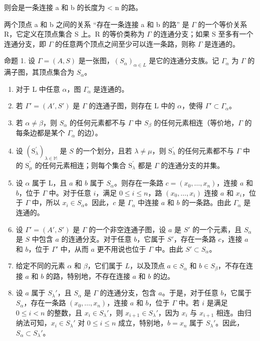 则会是一条连接 a 和 b 的长度为 \textless{} n 的路。

两个顶点 a 和 b 之间的关系 ``存在一条连接 a 和 b 的路'' 是 \(\Gamma\) 的一个等价关系 R，它定义在顶点集合 S 上。R 的等价类称为 \(\Gamma\) 的连通分支；如果 S 至多有一个连通分支，即 \(\Gamma\) 的任意两个顶点之间至少可以连一条路，则称 \(\Gamma\) 是连通的。

命题 1. 设 \(\Gamma = (A, S)\) 是一张图，\((S_{\alpha})_{\alpha \in L}\) 是它的连通分支族。记 \(\Gamma_{\alpha}\) 为 \(\Gamma\) 的满子图，其顶点集合为 \(S_{\alpha}\)。

\begin{enumerate}
\def\labelenumi{(\roman{enumi})}
\item
  对于 L 中任意 \(\alpha\)，图 \(\Gamma_{\alpha}\) 是连通的。
\item
  若 \(\Gamma' = (A', S')\) 是 \(\Gamma\) 的连通子图，则存在 L 中的 \(\alpha\)，使得 \(\Gamma' \subset \Gamma_{\alpha}\)。
\item
  若 \(\alpha \neq \beta\)，则 \(S_{\alpha}\) 的任何元素都不与 \(\Gamma\) 中 \(S_{\beta}\) 的任何元素相连（等价地，\(\Gamma\) 的每条边都是某个 \(\Gamma_{\alpha}\) 的边）。
\item
  设 \((\mathrm{S}_{\lambda}^{\prime})_{\lambda \in \mathbb{M}}\) 是 \(S\) 的一个划分，且若 \(\lambda \neq \mu\)，则 \(\mathrm{S}_{\lambda}^{\prime}\) 的任何元素都不与 \(\Gamma\) 中的 \(\mathrm{S}_{\mu}^{\prime}\) 的任何元素相连；则每个集合 \(\mathrm{S}_{\lambda}^{\prime}\) 都是 \(\Gamma\) 的连通分支的并集。
\item
  设 \(\alpha\) 属于 L，且 \(a\) 和 \(b\) 属于 \(S_{\alpha}\)。则存在一条路 \(c = (x_0, \ldots, x_n)\)，连接 \(a\) 和 \(b\)，位于 \(\Gamma\) 中。对于任意 \(i\)，满足 \(0 \leqslant i \leqslant n\)，路 \((x_0, \ldots, x_i)\) 连接 \(a\) 和 \(x_i\)，位于 \(\Gamma\) 中，所以 \(x_i \in S_{\alpha}\)。因此，\(c\) 是 \(\Gamma_{\alpha}\) 中连接 \(a\) 和 \(b\) 的一条路。由此 \(\Gamma_{\alpha}\) 是连通的。
\item
  设 \(\Gamma' = (A', S')\) 是 \(\Gamma\) 的一个非空连通子图，设 \(a\) 是 \(S'\) 的一个元素，且 \(S_{\alpha}\) 是 \(S\) 中包含 \(a\) 的连通分支。对于任意 \(b\)，它属于 \(S'\)，存在一条路 \(c\)，连接 \(a\) 和 \(b\)，位于 \(\Gamma'\) 中，从而 \(a\) 更不用说也位于 \(\Gamma\) 中。由此 \(S' \subset S_{\alpha}\)。
\item
  给定不同的元素 \(\alpha\) 和 \(\beta\)，它们属于 \(L\)，以及顶点 \(a \in S_{\alpha}\) 和 \(b \in S_{\beta}\)，不存在连接 \(a\) 和 \(b\) 的路，特别地，不存在连接 \(a\) 和 \(b\) 的边。
\item
  设 \(a\) 属于 \(S_{\lambda}'\)，且 \(S_{\alpha}\) 是 \(\Gamma\) 的连通分支，包含 \(a\)。于是，对于任意 \(b\)，它属于 \(S_{\alpha}\)，存在一条路 \((x_0, \ldots, x_n)\)，连接 \(a\) 和 \(b\)，位于 \(\Gamma\) 中。若 \(i\) 是满足 \(0 \leqslant i < n\) 的整数，且 \(x_i \in S_{\lambda}'\)，则 \(x_{i+1} \in S_{\lambda}'\)，因为 \(x_i\) 与 \(x_{i+1}\) 相连。由归纳法可知，\(x_i \in S_{\lambda}'\) 对 \(0 \leqslant i \leqslant n\) 成立，特别地，\(b = x_n\) 属于 \(S_{\lambda}'\)。因此，\(S_{\alpha} \subset S_{\lambda}'\)。
\end{enumerate}

